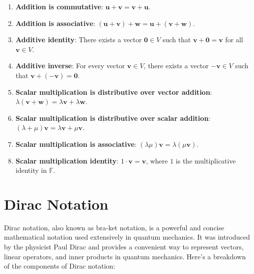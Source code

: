 \begin{enumerate}
    \item \textbf{Addition is commutative}: $\mathbf{u} + \mathbf{v} = \mathbf{v} + \mathbf{u}$.
    \item \textbf{Addition is associative}: $(\mathbf{u} + \mathbf{v}) + \mathbf{w} = \mathbf{u} + (\mathbf{v} + \mathbf{w})$.
    \item \textbf{Additive identity}: There exists a vector $\mathbf{0} \in V$ such that $\mathbf{v} + \mathbf{0} = \mathbf{v}$ for all $\mathbf{v} \in V$.
    \item \textbf{Additive inverse}: For every vector $\mathbf{v} \in V$, there exists a vector $-\mathbf{v} \in V$ such that $\mathbf{v} + (-\mathbf{v}) = \mathbf{0}$.
    \item \textbf{Scalar multiplication is distributive over vector addition}: $\lambda (\mathbf{v} + \mathbf{w}) = \lambda \mathbf{v} + \lambda \mathbf{w}$.
    \item \textbf{Scalar multiplication is distributive over scalar addition}: $(\lambda + \mu) \mathbf{v} = \lambda \mathbf{v} + \mu \mathbf{v}$.
    \item \textbf{Scalar multiplication is associative}: $(\lambda \mu) \mathbf{v} = \lambda (\mu \mathbf{v})$.
    \item \textbf{Scalar multiplication identity}: $1 \cdot \mathbf{v} = \mathbf{v}$, where $1$ is the multiplicative identity in $\mathbb{F}$.
\end{enumerate}


\section{Dirac Notation}
Dirac notation, also known as bra-ket notation, is a powerful and concise mathematical notation used extensively in quantum mechanics.
It was introduced by the physicist Paul Dirac and provides a convenient way to represent vectors, linear operators, and inner products in quantum mechanics.
Here's a breakdown of the components of Dirac notation:

